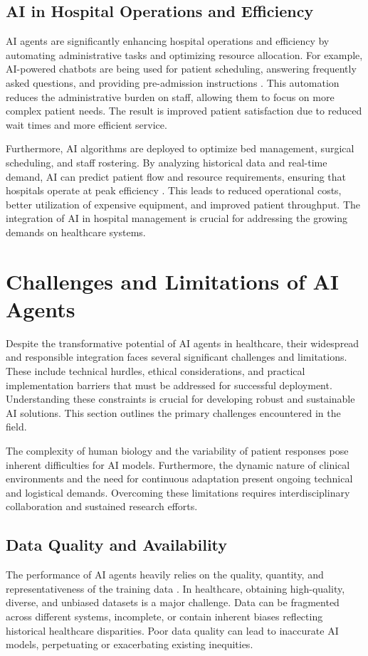 \documentclass[12pt,a4paper]{article}
\begin{document}
\subsection{AI in Hospital Operations and Efficiency}
\label{subsec:hospital-operations}
AI agents are significantly enhancing hospital operations and efficiency by automating administrative tasks and optimizing resource allocation. For example, AI-powered chatbots are being used for patient scheduling, answering frequently asked questions, and providing pre-admission instructions \cite{televox_patient_engagement}. This automation reduces the administrative burden on staff, allowing them to focus on more complex patient needs. The result is improved patient satisfaction due to reduced wait times and more efficient service.

Furthermore, AI algorithms are deployed to optimize bed management, surgical scheduling, and staff rostering. By analyzing historical data and real-time demand, AI can predict patient flow and resource requirements, ensuring that hospitals operate at peak efficiency \cite{jll_commercial_real_estate}. This leads to reduced operational costs, better utilization of expensive equipment, and improved patient throughput. The integration of AI in hospital management is crucial for addressing the growing demands on healthcare systems.

\section{Challenges and Limitations of AI Agents}
\label{sec:challenges-limitations}
Despite the transformative potential of AI agents in healthcare, their widespread and responsible integration faces several significant challenges and limitations. These include technical hurdles, ethical considerations, and practical implementation barriers that must be addressed for successful deployment. Understanding these constraints is crucial for developing robust and sustainable AI solutions. This section outlines the primary challenges encountered in the field.

The complexity of human biology and the variability of patient responses pose inherent difficulties for AI models. Furthermore, the dynamic nature of clinical environments and the need for continuous adaptation present ongoing technical and logistical demands. Overcoming these limitations requires interdisciplinary collaboration and sustained research efforts.

\subsection{Data Quality and Availability}
\label{subsec:data-quality}
The performance of AI agents heavily relies on the quality, quantity, and representativeness of the training data \cite{nih_ethical_implications}. In healthcare, obtaining high-quality, diverse, and unbiased datasets is a major challenge. Data can be fragmented across different systems, incomplete, or contain inherent biases reflecting historical healthcare disparities. Poor data quality can lead to inaccurate AI models, perpetuating or exacerbating existing inequities.
\end{document}
